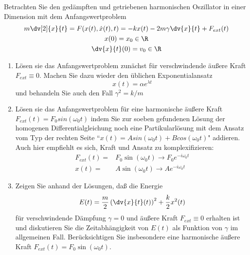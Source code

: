 \begin{Problem}
Betrachten Sie den gedämpften und getriebenen harmonischen Oszillator in
einer Dimension mit dem Anfangswertproblem
\begin{gather*}
	m\dv[2]{x}{t}=F(x(t),\dot{x}(t),t)=-kx(t)-2m\gamma\dv{x}{t}+F_{ext}(t)\\
	x(0)=x_0\in \R\\
	\dv{x}{t}(0)=v_0\in \R
\end{gather*}
\begin{enumerate}
	\item Lösen sie das Anfangswertproblem zunächst für verschwindende äußere Kraft $F_{ext} \equiv 0$. Machen Sie dazu wieder den üblichen Exponentialansatz
	\[x(t)=\alpha e^{\lambda t}\]
	und behandeln Sie auch den Fall $\gamma^2=k/m$
	\item Lösen sie das Anfangswertproblem für eine harmonische äußere Kraft $F_{ext}(t) = F_0 sin(\omega_0 t)$ indem Sie zur soeben gefundenen Lösung der homogenen Differentialgleichung noch eine Partikularlösung mit dem Ansatz vom Typ der rechten Seite ``$x(t) = A sin(\omega_0 t)+B cos(\omega_0 t)$" addieren. Auch hier empfiehlt es sich, Kraft und Ansatz zu komplexifizieren:
	\begin{align*}
		F_{ext}(t)=& F_0\sin(\omega_0t)\to F_0 e^{-i\omega_0 t}\\
		x(t)=&A\sin(\omega_0 t)\to Ae^{-i\omega_0 t}
	\end{align*}
	\item Zeigen Sie anhand der Lösungen, daß die Energie
	\[E(t)=\frac m2\left(\dv{x}{t}(t)\right)^2+\frac k2x^2(t)\]
	für verschwindende Dämpfung $\gamma = 0$ und äußere Kraft $F_{ext} \equiv 0$ erhalten ist und diskutieren Sie die Zeitabhängigkeit von $E(t)$ als Funktion von $\gamma$ im allgemeinen Fall. Berücksichtigen Sie insbesondere eine harmonische äußere Kraft $F_{ext}(t) = F_0 \sin(\omega_0 t)$.
\end{enumerate}
\end{Problem}

